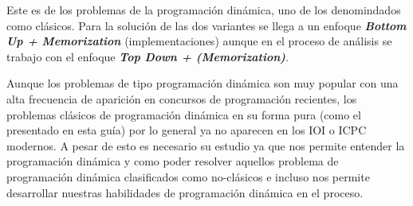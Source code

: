 Este es de los problemas de la programación dinámica, uno de los denomindados como clásicos. Para la solución de las dos variantes se llega a un enfoque \textbf{\emph{Bottom Up + Memorization}} (implementaciones) aunque en el proceso de análisis se trabajo con el enfoque \textbf{\emph{Top Down + (Memorization)}}. 

Aunque los problemas de tipo programación dinámica son muy popular con una alta frecuencia de aparición en concursos de programación
recientes, los problemas clásicos de programación dinámica en su forma pura (como el presentado en esta guía) por lo general ya no aparecen en los IOI o ICPC modernos. A pesar de esto es necesario su estudio ya
que nos permite entender la programación dinámica y como poder resolver aquellos problema de programación dinámica clasificados como no-clásicos e incluso nos permite desarrollar nuestras habilidades de programación
dinámica en el proceso.